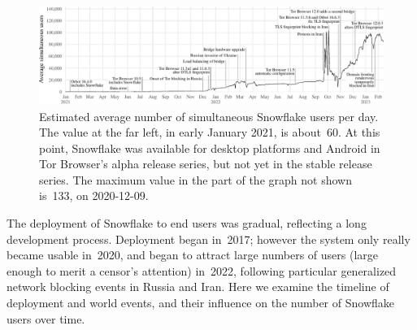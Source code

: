 \documentclass[letterpaper,twocolumn]{article}
\begin{document}

\begin{figure}[t]
\includegraphics{figures/users-global/users-global}
\caption{
Estimated average number of simultaneous Snowflake users per day.
The value at the far left,
in early January 2021, is about~60.
At this point, Snowflake was available
for desktop platforms and Android
in Tor Browser's alpha release series,
but not yet in the stable release series.
The maximum value in the part of the graph not shown
is~133, on \mbox{2020-12-09}.
}
\label{fig:user-counts}
\end{figure}

The deployment of Snowflake to end users was gradual,
reflecting a long development process.
Deployment began in~2017;
however the system only really became usable in~2020,
and began to attract large numbers of users
(large enough to merit a censor's attention)
in~2022, following particular generalized
network blocking events in Russia and Iran.
Here we examine the timeline of deployment
and world events,
and their influence on the number of Snowflake users over time.
\end{document}
